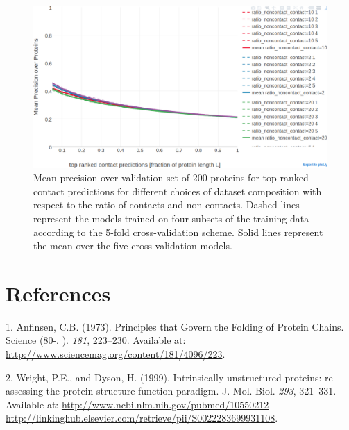 \documentclass[11pt,a4paper,twoside]{book}
\theoremstyle{definition}
\theoremstyle{definition}
\theoremstyle{remark}
\begin{document}
\begin{figure}

{\centering \includegraphics[width=0.9\linewidth]{img/random_forest_contact_prior/cross_validation/precision_vs_rank_cv_on_test_random_forest_nestimators1000_maxfeatureslog2_maxdepth10_minsamplesleaf100_ratio} 

}

\caption{Mean precision over
validation set of 200 proteins for top ranked contact predictions for
different choices of dataset composition with respect to the ratio of
contacts and non-contacts. Dashed lines represent the models trained on
four subsets of the training data according to the 5-fold
cross-validation scheme. Solid lines represent the mean over the five
cross-validation models.}\label{fig:random-forest-rationoncontactthr-cv}
\end{figure}

\backmatter

\listoffigures
{}

\listoftables
{}

\chapter*{References}\label{references}

\hypertarget{refs}{}
\hypertarget{ref-Anfinsen1973}{}
1. Anfinsen, C.B. (1973). Principles that Govern the Folding of Protein
Chains. Science (80-. ). \emph{181}, 223--230. Available at:
\url{http://www.sciencemag.org/content/181/4096/223}.

\hypertarget{ref-Wright1999}{}
2. Wright, P.E., and Dyson, H. (1999). Intrinsically unstructured
proteins: re-assessing the protein structure-function paradigm. J. Mol.
Biol. \emph{293}, 321--331. Available at:
\href{http://www.ncbi.nlm.nih.gov/pubmed/10550212\%20http://linkinghub.elsevier.com/retrieve/pii/S0022283699931108}{http://www.ncbi.nlm.nih.gov/pubmed/10550212 http://linkinghub.elsevier.com/retrieve/pii/S0022283699931108}.
\end{document}
